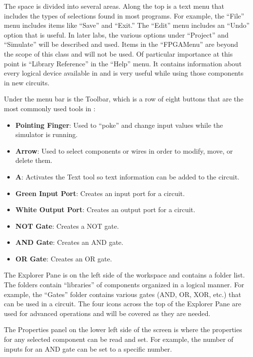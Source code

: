 The \LE space is divided into several areas. Along the top is a text menu that includes the types of selections found in most programs. For example, the ``File'' menu includes items like ``Save'' and ``Exit.'' The ``Edit'' menu includes an ``Undo'' option that is useful. In later labs, the various options under ``Project'' and ``Simulate'' will be described and used. Items in the ``FPGAMenu'' are beyond the scope of this class and will not be used. Of particular importance at this point is ``Library Reference'' in the ``Help'' menu. It contains information about every logical device available in \LE and is very useful while using those components in new circuits. 

Under the menu bar is the Toolbar, which is a row of eight buttons that are the most commonly used tools in \LE: 

\begin{itemize}
	\item \textbf{Pointing Finger}: Used to ``poke'' and change input values while the simulator is running. 
	\item \textbf{Arrow}: Used to select components or wires in order to modify, move, or delete them. 
	\item \textbf{A}: Activates the Text tool so text information can be added to the circuit. 
	\item \textbf{Green Input Port}: Creates an input port for a circuit. 
	\item \textbf{White Output Port}: Creates an output port for a circuit. 
	\item \textbf{NOT Gate}: Creates a NOT gate. 
	\item \textbf{AND Gate}: Creates an AND gate. 
	\item \textbf{OR Gate}: Creates an OR gate. 
\end{itemize}

The Explorer Pane is on the left side of the workspace and contains a folder list. The folders contain ``libraries'' of components organized in a logical manner. For example, the ``Gates'' folder contains various gates (AND, OR, XOR, etc.) that can be used in a circuit. The four icons across the top of the Explorer Pane are used for advanced operations and will be covered as they are needed. 

The Properties panel on the lower left side of the screen is where the properties for any selected component can be read and set. For example, the number of inputs for an AND gate can be set to a specific number.

